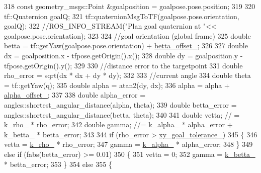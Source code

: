 \begin{DoxyCode}
{318     \textcolor{keyword}{const} geometry\_msgs::Point &goalposition = goalpose.pose.position;
319 
320     tf::Quaternion goalQ;
321     tf::quaternionMsgToTF(goalpose.pose.orientation, goalQ);
322     \textcolor{comment}{//ROS\_INFO\_STREAM("Plan goal quaternion at "<< goalpose.pose.orientation);}
323 
324     \textcolor{comment}{//goal orientation (global frame)}
325     \textcolor{keywordtype}{double} betta = tf::getYaw(goalpose.pose.orientation) + \hyperlink{classcl__move__base__z_1_1forward__local__planner_1_1ForwardLocalPlanner_a935db3e785e3276d42b34d58011e793c}{betta\_offset\_};
326 
327     \textcolor{keywordtype}{double} dx = goalposition.x - tfpose.getOrigin().x();
328     \textcolor{keywordtype}{double} dy = goalposition.y - tfpose.getOrigin().y();
329 
330     \textcolor{comment}{//distance error to the targetpoint}
331     \textcolor{keywordtype}{double} rho\_error = sqrt(dx * dx + dy * dy);
332 
333     \textcolor{comment}{//current angle}
334     \textcolor{keywordtype}{double} theta = tf::getYaw(q);
335     \textcolor{keywordtype}{double} alpha = atan2(dy, dx);
336     alpha = alpha + \hyperlink{classcl__move__base__z_1_1forward__local__planner_1_1ForwardLocalPlanner_a3d1b7e2ddf54efd67e4935875c7b6a67}{alpha\_offset\_};
337 
338     \textcolor{keywordtype}{double} alpha\_error = angles::shortest\_angular\_distance(alpha, theta);
339     \textcolor{keywordtype}{double} betta\_error = angles::shortest\_angular\_distance(betta, theta);
340 
341     \textcolor{keywordtype}{double} vetta; \textcolor{comment}{// = k\_rho\_ * rho\_error;}
342     \textcolor{keywordtype}{double} gamma; \textcolor{comment}{//= k\_alpha\_ * alpha\_error + k\_betta\_ * betta\_error;}
343 
344     \textcolor{keywordflow}{if} (rho\_error > \hyperlink{classcl__move__base__z_1_1forward__local__planner_1_1ForwardLocalPlanner_acd2ed91ee166f03faeeb9d6a4b91084b}{xy\_goal\_tolerance\_})
345     \{
346         vetta = \hyperlink{classcl__move__base__z_1_1forward__local__planner_1_1ForwardLocalPlanner_a8ad1b04b0bdaa8a7bb878f5e5cebd4f8}{k\_rho\_} * rho\_error;
347         gamma = \hyperlink{classcl__move__base__z_1_1forward__local__planner_1_1ForwardLocalPlanner_a530117a51f06e426b6aacc08bbd38fff}{k\_alpha\_} * alpha\_error;
348     \}
349     \textcolor{keywordflow}{else} \textcolor{keywordflow}{if} (fabs(betta\_error) >= 0.01)
350     \{
351         vetta = 0;
352         gamma = \hyperlink{classcl__move__base__z_1_1forward__local__planner_1_1ForwardLocalPlanner_a7b89ccccd288e5384154e7d5b64b4014}{k\_betta\_} * betta\_error;
353     \}
354     \textcolor{keywordflow}{else}
355     \{
}
\end{DoxyCode}
